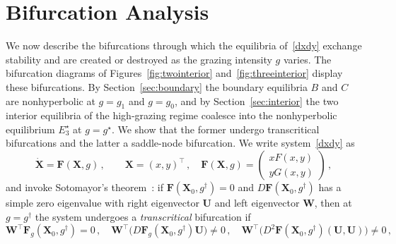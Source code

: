 \documentclass[reqno,11pt]{amsart}
\numberwithin{equation}{section}
\begin{document}
\bigskip

\section{Bifurcation Analysis}\label{sec:bif}
We now describe the bifurcations through which the equilibria of~\eqref{dxdy} exchange stability and are created or destroyed as the grazing intensity $g$ varies. The bifurcation diagrams of Figures~\ref{fig:twointerior} and~\ref{fig:threeinterior} display these bifurcations. By Section~\ref{sec:boundary} the boundary equilibria $B$ and $C$ are nonhyperbolic at $g=g_1$ and $g=g_0$, and by Section~\ref{sec:interior} the two interior equilibria of the high-grazing regime coalesce into the nonhyperbolic equilibrium $E_3^\star$ at $g=g^\star$. We show that the former undergo transcritical bifurcations and the latter a saddle-node bifurcation. We write system~\eqref{dxdy} as
\begin{equation}\label{Fmatrix}
\dot{\mathbf X}=\mathbf F(\mathbf X,g)\,,\qquad \mathbf X=(x,y)^\top\,,\quad \mathbf F(\mathbf X,g)=\begin{pmatrix}xF(x,y)\\ yG(x,y)\end{pmatrix}\,,
\end{equation}
and invoke Sotomayor's theorem~\cite[Sec.~4.2]{Pe01}: if $\mathbf F(\mathbf X_0,g^\dagger)=0$
and $D\mathbf F(\mathbf X_0,g^\dagger)$ has a simple zero eigenvalue with right eigenvector $\mathbf U$ and left eigenvector $\mathbf W$, then at $g=g^\dagger$ the system undergoes a {\it transcritical} bifurcation if
\begin{equation}\label{sotoT}
\mathbf W^\top\mathbf F_g(\mathbf X_0,g^\dagger)=0\,,\quad \mathbf W^\top\big(D\mathbf F_g(\mathbf X_0,g^\dagger)\mathbf U\big)\neq0\,,\quad \mathbf W^\top\big(D^2\mathbf F(\mathbf X_0,g^\dagger)(\mathbf U,\mathbf U)\big)\neq0\,,
\end{equation}
\end{document}
